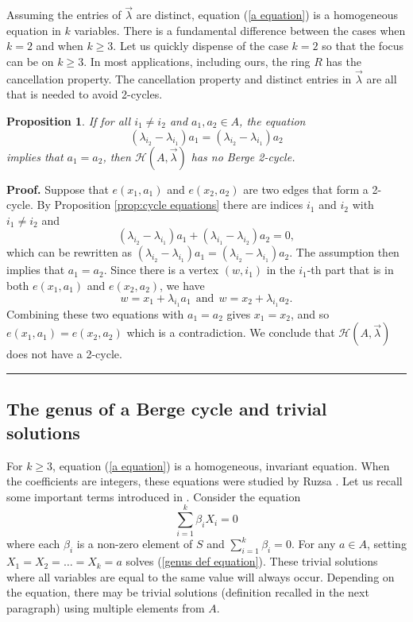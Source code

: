 \documentclass[12pt]{article}%
\newtheorem{proposition}[theorem]{Proposition}
\newenvironment{proof}[1][Proof]{\noindent\textbf{#1.} }
{\hfill \ \rule{0.5em}{0.5em}}
\begin{document}
Assuming the entries of $\vec{ \lambda}$ are distinct, equation (\ref{a equation}) is a homogeneous equation in $k$ variables.  There is a fundamental difference between the cases when $k = 2$ and when $k \geq 3$.  Let us quickly dispense of the case $k = 2$ so that the focus can be on $k \geq 3$.  
In most applications, including ours, the ring $R$ has the cancellation property.  The cancellation property and distinct entries in $\vec{\lambda}$ are all that is needed to avoid 2-cycles.  

\begin{proposition}\label{prop: linear}
If for all $i_1 \neq i_2$ and $a_1 , a_2 \in A$, 
the equation 
\[
( \lambda_{i_2} - \lambda_{i_1} ) a_1 =
( \lambda_{i_2} - \lambda_{i_1} ) a_2
\]
implies that $a_1 = a_2$, then $\mathcal{H}( A , \vec{ \lambda} )$ has no Berge 2-cycle.   
\end{proposition}
\begin{proof}
Suppose that $e (x_1,a_1)$ and $ e (x_2 ,a_2)$ are two edges that form a 2-cycle.  
By Proposition \ref{prop:cycle equations} there are indices $i_1$ and $i_2$ with $i_1 \neq i_2$ and 
\[
( \lambda_{i_2} - \lambda_{i_1} ) a_1 + ( \lambda_{i_1} - \lambda_{i_2} ) a_2 = 0,  
\]
which can be rewritten as $( \lambda_{i_2} - \lambda_{i_1} ) a_1 = ( \lambda_{i_2} - \lambda_{i_1} ) a_2$.  The assumption then implies that $a_1 = a_2$.  Since there is a vertex $(w, i_1)$ in the 
$i_1$-th part that is in both $e(x_1,a_1)$ and $e(x_2,a_2)$, we have 
\[
w = x_1 + \lambda_{i_1} a_1 ~~\mbox{and} ~~ w  = x_2 + \lambda_{i_1}a_2.
\]
Combining these two equations with $a_1 = a_2$ gives $x_1 = x_2$, and so $e(x_1, a_1) = e(x_2 , a_2)$ which is a contradiction.  
We conclude that $\mathcal{H}(A, \vec{ \lambda} )$ does not have a 2-cycle.      
\end{proof}




\subsection{The genus of a Berge cycle and trivial solutions}

For $k \geq 3$, equation (\ref{a equation}) is a homogeneous, invariant equation.  
When the coefficients are integers, these equations were studied by Ruzsa \cite{Ruzsa}.
Let us recall some important terms introduced 
in \cite{Ruzsa}.  Consider the equation 
\begin{equation}\label{genus def equation}
\sum_{i=1}^{k} \beta_i X_i = 0
\end{equation}
where each $\beta_i$ is a non-zero element of $S$ and $\sum_{i=1}^k \beta_i = 0$. 
For any $a \in A$, setting $X_1 = X_2 = \dots = X_k  = a$ solves (\ref{genus def equation}).  These trivial solutions where all variables are equal to the same value will always occur.  
Depending on the equation, there may be trivial solutions (definition recalled in the next paragraph) using multiple elements from $A$.    
\end{document}

